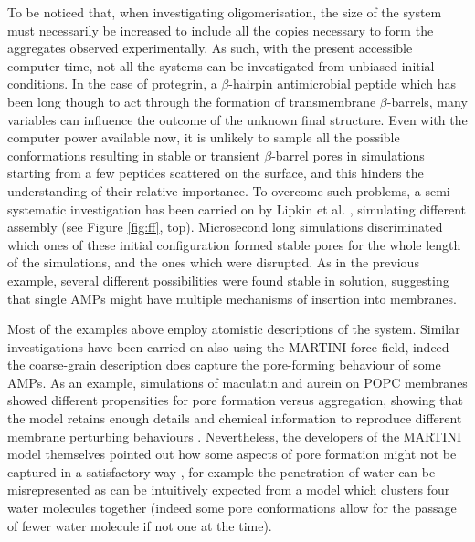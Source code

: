 To be noticed that, when investigating oligomerisation, the size of the system must necessarily be increased to include all the copies necessary to form the aggregates observed experimentally. As such, with the present accessible computer time, not all the systems can be investigated from unbiased initial conditions.
%
In the case of protegrin, a $\beta$-hairpin antimicrobial peptide which has been long though to act through the formation of transmembrane $\beta$-barrels, many variables can influence the outcome of the unknown final structure.
%
Even with the computer power available now, it is unlikely to sample all the possible conformations resulting in stable or transient $\beta$-barrel pores in simulations starting from a few peptides scattered on the surface, and this hinders the understanding of their relative importance.
%
To overcome such problems, a semi-systematic investigation has been carried on by Lipkin et al. \cite{Lipkin2017}, simulating different assembly (see Figure \ref{fig:ff}, top).
%
Microsecond long simulations discriminated which ones of these initial configuration formed stable pores for the whole length of the simulations, and the ones which were disrupted. As in the previous example, several different possibilities were found stable in solution, suggesting that single AMPs might have multiple mechanisms of insertion into membranes.

Most of the examples above employ atomistic descriptions of the system. Similar investigations have been carried on also using the MARTINI force field, indeed the coarse-grain description does capture the pore-forming behaviour of some AMPs.
%
As an example, simulations of maculatin and aurein on POPC membranes showed different propensities for pore formation versus aggregation, showing that the model retains enough details and chemical information to reproduce different membrane perturbing behaviours \cite{Balatti2017}.
%
Nevertheless, the developers of the MARTINI model themselves pointed out how some aspects of pore formation might not be captured in a satisfactory way \cite{Marrink2013}, for example the penetration of water can be misrepresented as can be intuitively expected from a model which clusters four water molecules together (indeed some pore conformations allow for the passage of fewer water molecule if not one at the time).

